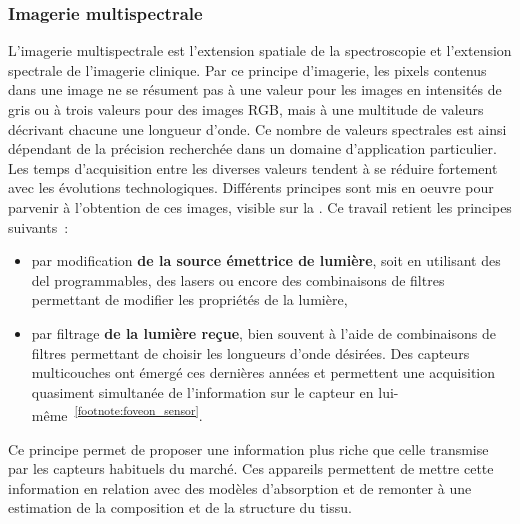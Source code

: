 \addtocounter{footnote}{1}

\subsubsection{Imagerie multispectrale}
L'imagerie multispectrale est l'extension spatiale de la spectroscopie et l'extension spectrale de l'imagerie clinique. Par ce principe d'imagerie, les pixels contenus dans une image ne se résument pas à une valeur pour les images en intensités de gris ou à trois valeurs pour des images RGB, mais à une multitude de valeurs décrivant chacune une longueur d'onde. Ce nombre de valeurs spectrales est ainsi dépendant de la précision recherchée dans un domaine d'application particulier. Les temps d'acquisition entre les diverses valeurs tendent à se réduire fortement avec les évolutions technologiques. Différents principes sont mis en oeuvre pour parvenir à l'obtention de ces images, visible sur la . Ce travail retient les principes suivants~:
\begin{itemize}
    \item par modification \textbf{de la source émettrice de lumière}, soit en utilisant des \gls{del} programmables, des lasers ou encore des combinaisons de filtres permettant de modifier les propriétés de la lumière,
    \item par filtrage \textbf{de la lumière reçue}, bien souvent à l'aide de combinaisons de filtres permettant de choisir les longueurs d'onde désirées. Des capteurs multicouches ont émergé ces dernières années et permettent une acquisition quasiment simultanée de l'information sur le capteur en lui-même~\textsuperscript{\ref{footnote:foveon_sensor}}.
\end{itemize}\par

Ce principe permet de proposer une information plus riche que celle transmise par les capteurs habituels du marché. Ces appareils permettent de mettre cette information en relation avec des modèles d'absorption et de remonter à une estimation de la composition et de la structure du tissu.\par 

\addtocounter{footnote}{1}

